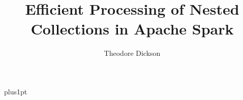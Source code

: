 \documentclass[12pt]{ociamthesis}  %
\title{Efficient Processing of Nested Collections in Apache Spark}   %
\author{Theodore Dickson}         %
\begin{document}
\baselineskip=18pt plus1pt

\setcounter{secnumdepth}{3}
\setcounter{tocdepth}{3}


\maketitle                  %

\begin{romanpages}          %
\tableofcontents            %
\end{romanpages}            %






%

%
%

\end{document}

